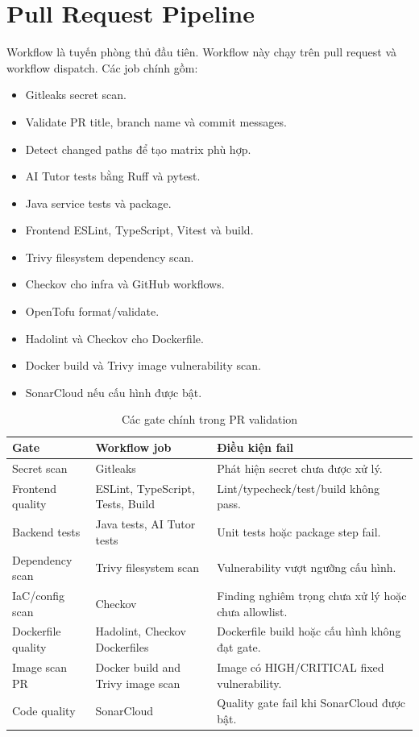 \section{Pull Request Pipeline}

Workflow  là tuyến phòng thủ đầu tiên. Workflow này chạy trên pull request và workflow dispatch. Các job chính gồm:

\begin{itemize}
  \item Gitleaks secret scan.
  \item Validate PR title, branch name và commit messages.
  \item Detect changed paths để tạo matrix phù hợp.
  \item AI Tutor tests bằng Ruff và pytest.
  \item Java service tests và package.
  \item Frontend ESLint, TypeScript, Vitest và build.
  \item Trivy filesystem dependency scan.
  \item Checkov cho infra và GitHub workflows.
  \item OpenTofu format/validate.
  \item Hadolint và Checkov cho Dockerfile.
  \item Docker build và Trivy image vulnerability scan.
  \item SonarCloud nếu cấu hình được bật.
\end{itemize}

\begin{table}[H]
\centering
\caption{Các gate chính trong PR validation}
\label{tab:pr-gates}
\begin{tabularx}{\textwidth}{|p{}|p{}|Y|}
\hline
\textbf{Gate} & \textbf{Workflow job} & \textbf{Điều kiện fail} \\
\hline
Secret scan & Gitleaks & Phát hiện secret chưa được xử lý. \\
Frontend quality & ESLint, TypeScript, Tests, Build & Lint/typecheck/test/build không pass. \\
Backend tests & Java tests, AI Tutor tests & Unit tests hoặc package step fail. \\
Dependency scan & Trivy filesystem scan & Vulnerability vượt ngưỡng cấu hình. \\
IaC/config scan & Checkov & Finding nghiêm trọng chưa xử lý hoặc chưa allowlist. \\
Dockerfile quality & Hadolint, Checkov Dockerfiles & Dockerfile build hoặc cấu hình không đạt gate. \\
Image scan PR & Docker build and Trivy image scan & Image có HIGH/CRITICAL fixed vulnerability. \\
Code quality & SonarCloud & Quality gate fail khi SonarCloud được bật. \\
\hline
\end{tabularx}
\end{table}

